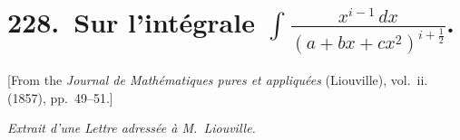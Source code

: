 \documentclass[11pt,a4paper]{book}
\begin{document}
\chapter[Sur l'int\'{e}grale $\int\frac{x^{i-1}\,dx}{(a+bx+cx^2)^{i+\frac{1}{2}}}$]{228.\ Sur l'int\'{e}grale $\displaystyle\int\frac{x^{i-1}\,dx}{(a+bx+cx^2)^{i+\frac{1}{2}}}$.}
\label{paper228}

\begin{center}
\small
[From the \textit{Journal de Math\'{e}matiques pures et appliqu\'{e}es} (Liouville), vol.~ii. (1857), pp.~49--51.]

\smallskip
\textit{Extrait d'une Lettre adress\'{e}e \`{a} M.~Liouville.}
\end{center}

\bigskip
\end{document}
